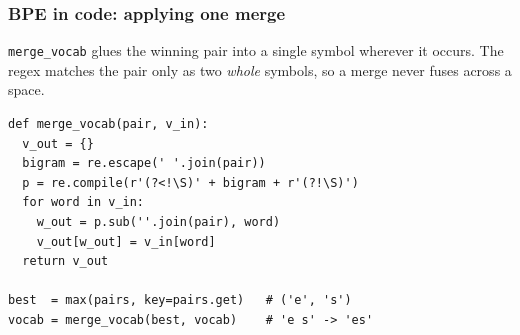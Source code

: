 \documentclass[aspectratio=169]{beamer}
\begin{document}
\begin{frame}[fragile]
\frametitle{BPE in code: applying one merge}
\vspace{-0.1cm}
{\small \texttt{merge\_vocab} glues the winning pair into a single symbol wherever it occurs. The regex matches the pair only as two \emph{whole} symbols, so a merge never fuses across a space.}

\vspace{0.15cm}
\begin{lstlisting}
def merge_vocab(pair, v_in):
  v_out = {}
  bigram = re.escape(' '.join(pair))
  p = re.compile(r'(?<!\S)' + bigram + r'(?!\S)')
  for word in v_in:
    w_out = p.sub(''.join(pair), word)
    v_out[w_out] = v_in[word]
  return v_out

best  = max(pairs, key=pairs.get)   # ('e', 's')
vocab = merge_vocab(best, vocab)    # 'e s' -> 'es'
\end{lstlisting}

\vspace{0.15cm}
\begin{center}
\end{center}
\end{frame}
\end{document}
